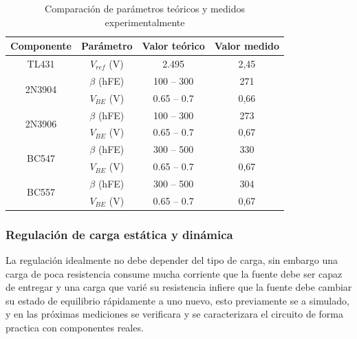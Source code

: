 \documentclass[]{article}
\begin{document}
	
	\begin{table}[H]
		\centering
		\caption{Comparación de parámetros teóricos y medidos experimentalmente}
		\label{tab:comparacion_componentes}
		\begin{tabular}{|c|c|c|c|}
			\hline
			\textbf{Componente} & \textbf{Parámetro} & \textbf{Valor teórico} & \textbf{Valor medido} \\
			\hline
			
			\multirow{1}{*}{TL431} 
			& $V_{ref}$ (V) & 2.495 & 2,45 \\
			\hline 
			
			
			
			\multirow{2}{*}{2N3904} 
			& $\beta$ (hFE) & 100 -- 300 & 271 \\
			& $V_{BE}$ (V) & 0.65 -- 0.7 & 0,66 \\
			\hline
			
			\multirow{2}{*}{2N3906} 
			& $\beta$ (hFE) & 100 -- 300 & 273 \\
			& $V_{BE}$ (V) & 0.65 -- 0.7 & 0,67 \\
			\hline
			
			\multirow{2}{*}{BC547} 
			& $\beta$ (hFE) & 300 -- 500 & 330 \\
			& $V_{BE}$ (V) & 0.65 -- 0.7 & 0,67 \\
			\hline
			
			\multirow{2}{*}{BC557} 
			& $\beta$ (hFE) & 300 -- 500 & 304 \\
			& $V_{BE}$ (V) & 0.65 -- 0.7 & 0,67 \\
			\hline
			
		\end{tabular}
	\end{table}
	
	\subsubsection{Regulación de carga estática y dinámica}
	\label{sec:regulacion}
	
	La regulación idealmente no debe depender del tipo de carga, sin embargo una carga de poca resistencia consume mucha corriente que la fuente debe ser capaz de entregar y una carga que varié su resistencia infiere que la fuente debe cambiar su estado de equilibrio rápidamente a uno nuevo, esto previamente se a simulado, y en las próximas mediciones se verificara y se caracterizara el circuito de forma practica con componentes reales.
	
\end{document}
